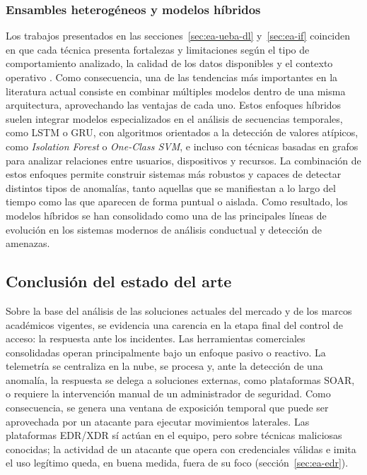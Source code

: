 \subsubsection{Ensambles heterogéneos y modelos híbridos}
Los trabajos presentados en las secciones~\ref{sec:ea-ueba-dl} y~\ref{sec:ea-if} coinciden en que cada técnica presenta fortalezas y limitaciones según el tipo de comportamiento analizado, la calidad de los datos disponibles y el contexto operativo \parencite{Artioli2024, Landauer2023Survey}. Como consecuencia, una de las tendencias más importantes en la literatura actual consiste en combinar múltiples modelos dentro de una misma arquitectura, aprovechando las ventajas de cada uno. Estos enfoques híbridos suelen integrar modelos especializados en el análisis de secuencias temporales, como LSTM o GRU, con algoritmos orientados a la detección de valores atípicos, como \emph{Isolation Forest} o \emph{One-Class SVM}, e incluso con técnicas basadas en grafos para analizar relaciones entre usuarios, dispositivos y recursos. La combinación de estos enfoques permite construir sistemas más robustos y capaces de detectar distintos tipos de anomalías, tanto aquellas que se manifiestan a lo largo del tiempo como las que aparecen de forma puntual o aislada. Como resultado, los modelos híbridos se han consolidado como una de las principales líneas de evolución en los sistemas modernos de análisis conductual y detección de amenazas.

\subsection{Conclusión del estado del arte}\label{sec:conclusion-estado-del-arte}
Sobre la base del análisis de las soluciones actuales del mercado y de los marcos académicos vigentes, se evidencia una carencia en la etapa final del control de acceso: la respuesta ante los incidentes. Las herramientas comerciales consolidadas operan principalmente bajo un enfoque pasivo o reactivo. La telemetría se centraliza en la nube, se procesa y, ante la detección de una anomalía, la respuesta se delega a soluciones externas, como plataformas SOAR, o requiere la intervención manual de un administrador de seguridad. Como consecuencia, se genera una ventana de exposición temporal que puede ser aprovechada por un atacante para ejecutar movimientos laterales. Las plataformas EDR/XDR sí actúan en el equipo, pero sobre técnicas maliciosas conocidas; la actividad de un atacante que opera con credenciales válidas e imita el uso legítimo queda, en buena medida, fuera de su foco (sección~\ref{sec:ea-edr}).

